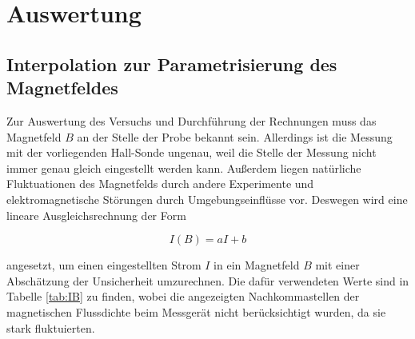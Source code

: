 \section{Auswertung}
\label{sec:Auswertung}

\subsection{Interpolation zur Parametrisierung des Magnetfeldes}

Zur Auswertung des Versuchs und Durchführung der Rechnungen muss das Magnetfeld $B$
an der Stelle der Probe bekannt sein. Allerdings ist die Messung mit der vorliegenden Hall-Sonde
ungenau, weil die Stelle der Messung nicht immer genau gleich eingestellt werden kann.
Außerdem liegen natürliche Fluktuationen des Magnetfelds durch andere Experimente und elektromagnetische
Störungen durch Umgebungseinflüsse vor. Deswegen wird eine lineare Ausgleichsrechnung der Form

\begin{equation*}
  I(B) = aI+b
\end{equation*}

angesetzt, um einen eingestellten Strom $I$ in ein Magnetfeld $B$ mit einer Abschätzung der Unsicherheit umzurechnen.
Die dafür verwendeten Werte sind in Tabelle \ref{tab:IB} zu finden, wobei die angezeigten Nachkommastellen der magnetischen Flussdichte beim Messgerät nicht berücksichtigt wurden, da sie stark fluktuierten.

